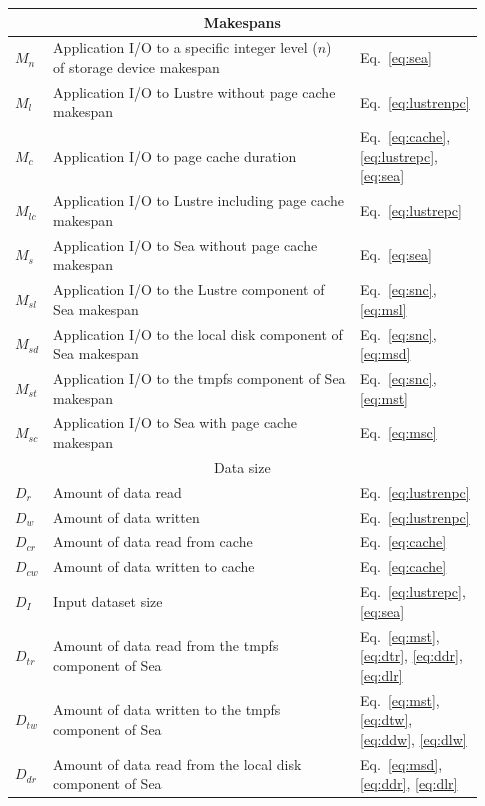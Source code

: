 \documentclass{report}
\begin{document}
    \begin{table}
    \centering
    \begin{tabular}{|p{0.03\linewidth}|p{0.7\linewidth}|p{0.2\linewidth}|} 
     \hline
     \multicolumn{3}{|c|}{Makespans} \\
     \hline
     $M_{n}$ & Application I/O to a specific integer level ($n$) of storage device makespan & Eq.~\ref{eq:sea}\\
     $M_{l}$ & Application I/O to Lustre without page cache makespan & Eq.~\ref{eq:lustrenpc}\\
     $M_{c}$ & Application I/O to page cache duration & Eq.~\ref{eq:cache}, \ref{eq:lustrepc}, \ref{eq:sea}\\
     $M_{lc}$ & Application I/O to Lustre including page cache makespan & Eq.~\ref{eq:lustrepc}\\
     $M_{s}$ & Application I/O to Sea without page cache makespan & Eq.~\ref{eq:sea}\\ 
     $M_{sl}$ & Application I/O to the Lustre component of Sea makespan & Eq.~\ref{eq:snc}, \ref{eq:msl} \\
     $M_{sd}$ & Application I/O to the local disk component of Sea makespan& Eq.~\ref{eq:snc}, \ref{eq:msd} \\
     $M_{st}$ & Application I/O to the tmpfs component of Sea makespan & Eq.~\ref{eq:snc}, \ref{eq:mst} \\
     $M_{sc}$ & Application I/O to Sea with page cache makespan & Eq.~\ref{eq:msc} \\ 
     \hline
     \multicolumn{3}{|c|}{Data size} \\
     \hline
     $D_{r}$ & Amount of data read & Eq.~\ref{eq:lustrenpc}\\
     $D_{w}$ & Amount of data written & Eq.~\ref{eq:lustrenpc}\\
     $D_{cr}$ & Amount of data read from cache & Eq.~\ref{eq:cache}\\
     $D_{cw}$ & Amount of data written to cache & Eq.~\ref{eq:cache}\\
     $D_{I}$ & Input dataset size & Eq.~\ref{eq:lustrepc}, \ref{eq:sea}\\
     $D_{tr}$ & Amount of data read from the tmpfs component of Sea & Eq.~\ref{eq:mst}, \ref{eq:dtr}, \ref{eq:ddr}, \ref{eq:dlr} \\
     $D_{tw}$ & Amount of data written to the tmpfs component of Sea & Eq.~\ref{eq:mst}, \ref{eq:dtw}, \ref{eq:ddw}, \ref{eq:dlw} \\
     $D_{dr}$ & Amount of data read from the local disk component of Sea & Eq.~\ref{eq:msd}, \ref{eq:ddr}, \ref{eq:dlr} \\

\end{tabular}
\end{table}
\end{document}
